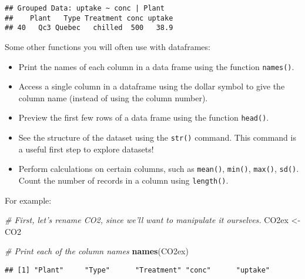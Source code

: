 \documentclass[]{article}
\newenvironment{Shaded}{\begin{snugshade}}{\end{snugshade}}
\newcommand{\CommentTok}[1]{\textcolor[rgb]{0.56,0.35,0.01}{\textit{#1}}}
\newcommand{\KeywordTok}[1]{\textcolor[rgb]{0.13,0.29,0.53}{\textbf{#1}}}
\newcommand{\NormalTok}[1]{#1}
\newcommand{\OperatorTok}[1]{\textcolor[rgb]{0.81,0.36,0.00}{\textbf{#1}}}
\newcommand{\StringTok}[1]{\textcolor[rgb]{0.31,0.60,0.02}{#1}}
\begin{document}
\begin{verbatim}
## Grouped Data: uptake ~ conc | Plant
##    Plant   Type Treatment conc uptake
## 40   Qc3 Quebec   chilled  500   38.9
\end{verbatim}

Some other functions you will often use with dataframes:

\begin{itemize}
\item
  Print the names of each column in a data frame using the function
  \texttt{names()}.
\item
  Access a single column in a dataframe using the dollar symbol to give
  the column name (instead of using the column number).
\item
  Preview the first few rows of a data frame using the function
  \texttt{head()}.
\item
  See the structure of the dataset using the \texttt{str()} command.
  This command is a useful first step to explore datasets!
\item
  Perform calculations on certain columns, such as \texttt{mean()},
  \texttt{min()}, \texttt{max()}, \texttt{sd()}. Count the number of
  records in a column using \texttt{length()}.
\end{itemize}

For example:

\begin{Shaded}
\begin{Highlighting}[]
\CommentTok{# First, let's rename CO2, since we'll want to manipulate it ourselves. }
\NormalTok{CO2ex <-}\StringTok{ }\NormalTok{CO2}
\end{Highlighting}
\end{Shaded}

\begin{Shaded}
\begin{Highlighting}[]
\CommentTok{# Print each of the column names}
\KeywordTok{names}\NormalTok{(CO2ex)}
\end{Highlighting}
\end{Shaded}

\begin{verbatim}
## [1] "Plant"     "Type"      "Treatment" "conc"      "uptake"
\end{verbatim}

\begin{Shaded}
\end{Shaded}
\end{document}
